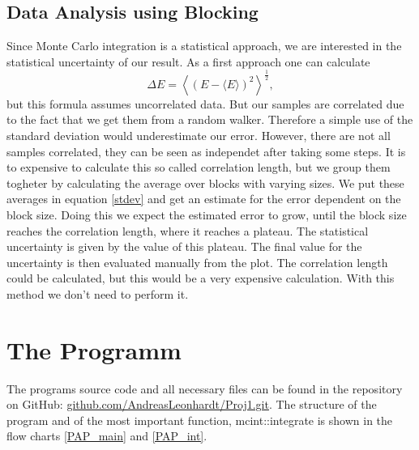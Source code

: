 \documentclass[a4paper,10pt]{article}
\begin{document}
\subsection{Data Analysis using Blocking}

Since Monte Carlo integration is a statistical approach, we are interested in the statistical uncertainty of our result.
As a first approach one can calculate 
\begin{equation}
 \Delta E = \left\langle \left(E - \langle E\rangle\right)^2 \right\rangle^{\frac12},
 \label{stdev}
\end{equation}
but this formula assumes uncorrelated data. But our samples are correlated due to the fact that we get them from a random walker.
Therefore a simple use of the standard deviation would underestimate our error. 
However, there are not all samples correlated, they can be seen as independet after taking some steps.
It is to expensive to calculate this so called correlation length, but we group them togheter by calculating the average over blocks with varying sizes.
We put these averages in equation \ref{stdev} and get an estimate for the error dependent on the block size.
Doing this we expect the estimated error to grow, until the block size reaches the correlation length, where it reaches a plateau. 
The statistical uncertainty is given by the value of this plateau. The final value for the uncertainty is then evaluated manually from the plot. 
The correlation length could be calculated, but this would be a very expensive calculation. With this method we don't need to perform it.





\section{The Programm}


The programs source code and all necessary files can be found in the repository on GitHub: 
\href{https://github.com/AndreasLeonhardt/Proj1.git}{github.com/AndreasLeonhardt/Proj1.git}.
The structure of the program and of the most important function, mcint::integrate is shown in the flow charts \ref{PAP_main} and \ref{PAP_int}.
\end{document}
